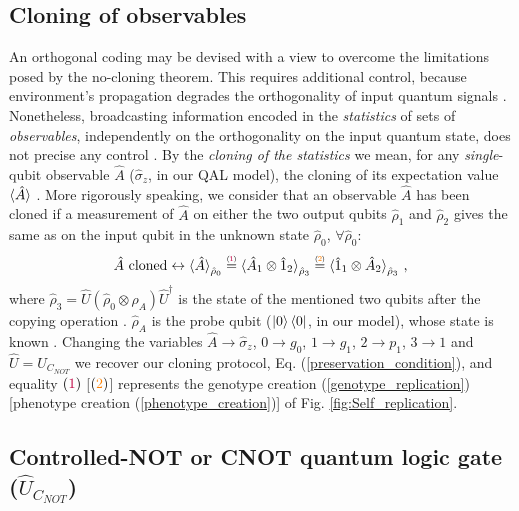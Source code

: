 \documentclass[11pt]{article}
\numberwithin{equation}{section} %
\numberwithin{figure}{section} %
\newcommand\numeq[1] %
  {\stackrel{\scriptscriptstyle(\mkern-1.5mu#1\mkern-1.5mu)}{=}}
\begin{document}
\begin{appendices}
\subsection{Cloning of observables} \label{cloning_of_observables}
An orthogonal coding may be devised with a view to overcome the limitations posed by the no-cloning theorem. This requires additional control, because environment's propagation degrades the orthogonality of input quantum signals \cite[p.~1, l.~5-8]{Ferraro}. Nonetheless, broadcasting information encoded in the \emph{statistics} of sets of \emph{observables}, independently on the orthogonality on the input quantum state, does not precise any control \cite[p.~1, l.~9-18]{Ferraro}. By the \emph{cloning of the statistics} we mean, for any \emph{single}-qubit observable $\hat{A}$ ($\hat{\sigma}_z$, in our QAL model), the cloning of its expectation value $\braket{\hat{A}}$ \cite[p.~2, l.~25-26]{Ferraro}. More rigorously speaking, we consider that an observable $\hat{A}$ has been cloned if a measurement of $\hat{A}$ on either the two output qubits $\hat{\rho}_1$ and $\hat{\rho}_2$ gives the same as on the input qubit in the unknown state $\hat{\rho}_0$, $\forall\hat{\rho}_0$: $\,\,$ \cite[p.~2, Eq.~(1)]{Ferraro}
\begin{equation}
\hat{A}\textrm{ cloned}\leftrightarrow\braket{\hat{A}}_{\hat{\rho}_0}\numeq{{\color{purple}1}} \braket{\hat{A}_1\otimes\hat{1}_2}_{\hat{\rho}_3}\numeq{{\color{orange}2}} \braket{\hat{1}_1\otimes\hat{A}_2}_{\hat{\rho}_3}\,\textrm{,}
\end{equation}
where $\hat{\rho}_3=\hat{U}(\hat{\rho}_0\otimes\hat{\rho}_A)\hat{U}^\dagger$ is the state of the mentioned two qubits after the copying operation \cite[p.~2, l.~16]{Ferraro}. $\hat{\rho}_A$ is the probe qubit ($\ket{0}\bra{0}$, in our model), whose state is known \cite[p.~2, l.~8-9 \& 30-33]{Ferraro}. Changing the variables $\hat{A}\to\hat{\sigma}_z$, $0\to g_0$, $1\to g_1$, $2\to p_1$, $3\to 1$ and $\hat{U}=\hat{U}_{C_{NOT}}$ \cite[p.~3, l.~38-40]{Ferraro} we recover our cloning protocol, Eq. (\ref{preservation_condition}), and equality $({\color{purple}1})$ [$({\color{orange}2})$] represents the {\color{purple}genotype creation} (\ref{genotype_replication}) [{\color{orange}phenotype creation} (\ref{phenotype_creation})] of Fig. \ref{fig:Self_replication}.\\


\subsection{Controlled-NOT or CNOT quantum logic gate ($\hat{U}_{C_{NOT}}$)} \label{U_CNOT_theory_Appendix}


\end{appendices}
\end{document}
